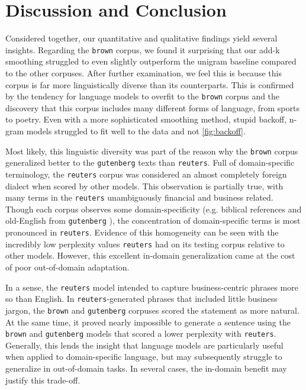 \documentclass[11pt,a4paper]{article}
\begin{document}
\section{Discussion and Conclusion}%
\label{sec:disc_conclusion}

Considered together, our quantitative and qualitative findings yield several insights. Regarding the \texttt{brown} corpus, we found it surprising that our add-k smoothing struggled to even slightly outperform the unigram baseline compared to the other corpuses. After further examination, we feel this is because this corpus is far more linguistically diverse than its counterparts. This is confirmed by the tendency for language models to overfit to the \texttt{brown} corpus and the discovery that this corpus includes many different forms of language, from sports to poetry. Even with a more sophisticated smoothing method, stupid backoff, n-gram models struggled to fit well to the data and not \ref{fig:backoff}. 

Most likely, this linguistic diversity was part of the reason why the \texttt{brown} corpus generalized better to the \texttt{gutenberg} texts than \texttt{reuters}. Full of domain-specific terminology, the \texttt{reuters} corpus was considered an almost completely foreign dialect when scored by other models. This observation is partially true, with many terms in the \texttt{reuters} unambiguously financial and business related. Though each corpus observes some domain-specificity (e.g. biblical references and old-English from \texttt{gutenberg} ), the concentration of domain-specific terms is most pronounced in \texttt{reuters}. Evidence of this homogeneity can be seen with the incredibly low perplexity values \texttt{reuters} had on its testing corpus relative to other models. However, this excellent in-domain generalization came at the cost of poor out-of-domain adaptation. 

In a sense, the \texttt{reuters} model intended to capture business-centric phrases more so than English. In \texttt{reuters}-generated phrases that included little business jargon, the \texttt{brown} and \texttt{gutenberg} corpuses scored the statement as more natural. At the same time, it proved nearly impossible to generate a sentence using the \texttt{brown} and \texttt{gutenberg} models that scored a lower perplexity with \texttt{reuters}. Generally, this lends the insight that language models are particularly useful when applied to domain-specific language, but may subsequently struggle to generalize in out-of-domain tasks. In several cases, the in-domain benefit may justify this trade-off.
\end{document}
